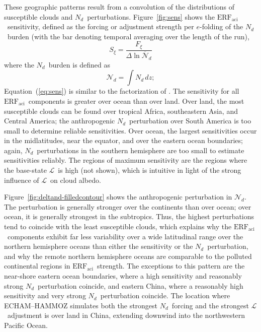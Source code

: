 \documentclass[acp, manuscript]{copernicus}\usepackage[]{graphicx}\usepackage[]{color}
\newcommand\nd{\ensuremath{N_d}}
\newcommand\lwp{\ensuremath{\mathcal L}}
\newcommand\erfaci{\ensuremath{\text{ERF}_\text{aci}}}
\begin{document}
These geographic patterns result from a convolution of the distributions of
susceptible clouds and \nd\ perturbations.  Figure~\ref{fig:sens} shows the
\erfaci\ sensitivity, defined as the forcing or adjustment strength per
$e$-folding of the \nd\ burden (with the bar denoting temporal averaging
over the length of the run),
\begin{equation}
  \label{eq:sens}
  S_\xi = \frac{F_\xi}{\Delta \ln \overline{\mathcal{N}}_d}
\end{equation}
where the \nd\ burden is defined as
\begin{equation}
  \label{eq:burden}
  \mathcal{N}_d = \int N_d\,dz;
\end{equation}
Equation~(\ref{eq:sens}) is similar to the factorization of
\citet{Bellouin2020}.  The sensitivity for all \erfaci\ components is greater
over ocean than over land.  Over land, the most susceptible clouds can be found
over tropical Africa, southeastern Asia, and Central America; the anthropogenic
\nd\ perturbation over South America is too small to determine reliable
sensitivities.  Over ocean, the largest sensitivities occur in the midlatitudes,
near the equator, and over the eastern ocean boundaries; again, \nd\
perturbations in the southern hemisphere are too small to estimate sensitivities
reliably.  The regions of maximum sensitivity are the regions where the
base-state \lwp\ is high (not shown), which is intuitive in light of the strong
influence of \lwp\ on cloud albedo.

Figure~\ref{fig:deltand-filledcontour} shows the anthropogenic perturbation in
$\mathcal{N}_d$.  The perturbation is generally stronger over the continents
than over ocean; over ocean, it is generally strongest in the subtropics.  Thus,
the highest perturbations tend to coincide with the least susceptible clouds,
which explains why the \erfaci\ components exhibit far less variability over a
wide latitudinal range over the northern hemisphere oceans than either the
sensitivity or the \nd\ perturbation, and why the remote northern hemisphere
oceans are comparable to the polluted continental regions in \erfaci\ strength.
The exceptions to this pattern are the near-shore eastern ocean boundaries,
where a high sensitivity and reasonably strong \nd\ perturbation coincide,
and eastern China, where a reasonably high sensitivity and very strong \nd\
perturbation coincide.  The location where ECHAM--HAMMOZ simulates both the
strongest \nd\ forcing and the strongest \lwp\ adjustment is over land in China,
extending downwind into the northwestern Pacific Ocean.
\end{document}

